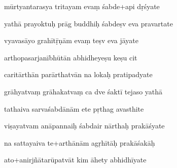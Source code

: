 \documentclass[article,12pt,a4paper]{memoir}%
\newcounter{parCount}
\begin{document}
	  
	  \pstart \leavevmode%
	mūrtyantarasya tritayam evaṃ śabde+api dṛśyate 
	{}
	\pend%
      

	  
	  \pstart {} yathā prayoktuḥ prāg buddhiḥ śabdeṣv eva pravartate 
	{}
	\pend%
      

	  
	  \pstart \leavevmode%
	vyavasāyo grahītṝṇām evaṃ teṣv eva jāyate 
	{}
	\pend%
      

	  
	  \pstart {} arthopasarjanībhūtān abhidheyeṣu keṣu cit 
	{}
	\pend%
      

	  
	  \pstart \leavevmode%
	caritārthān parārthatvān na lokaḥ pratipadyate 
	{}
	\pend%
      

	  
	  \pstart {} grāhyatvaṃ grāhakatvaṃ ca dve śaktī tejaso yathā 
	{}
	\pend%
      

	  
	  \pstart \leavevmode%
	tathaiva sarvaśabdānām ete pṛthag avasthite 
	{}
	\pend%
      

	  
	  \pstart {} viṣayatvam anāpannaiḥ śabdair nārthaḥ prakāśyate 
	{}
	\pend%
      

	  
	  \pstart \leavevmode%
	na sattayaiva te+arthānām agṛhītāḥ prakāśakāḥ 
	{}
	\pend%
      

	  
	  \pstart {} ato+anirjñātarūpatvāt kim āhety abhidhīyate 
	{}
	\pend%
      
\end{document}
